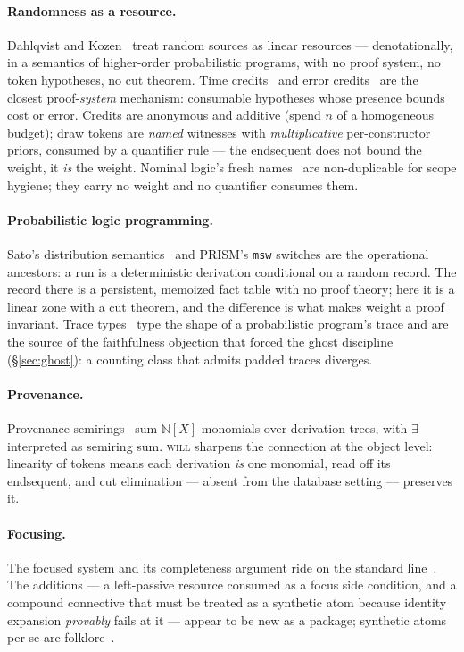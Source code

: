 \documentclass[11pt]{article}
\newcommand{\NN}{\mathbb{N}}                     %
\newcommand{\will}{\textsc{will}}                %
\theoremstyle{definition}
\theoremstyle{remark}
\begin{document}
\paragraph{Randomness as a resource.}  Dahlqvist and
Kozen~\cite{DahlqvistKozen2020} treat random sources as linear
resources --- denotationally, in a semantics of higher-order
probabilistic programs, with no proof system, no token hypotheses, no
cut theorem.  Time credits~\cite{CharguerraudPottier2017} and error
credits~\cite{Eris2024} are the closest proof-\emph{system} mechanism:
consumable hypotheses whose presence bounds cost or error.  Credits
are anonymous and additive (spend $n$ of a homogeneous budget);
draw tokens are \emph{named} witnesses with \emph{multiplicative}
per-constructor priors, consumed by a quantifier rule --- the
endsequent does not bound the weight, it \emph{is} the weight.
Nominal logic's fresh names~\cite{Pitts2003,MillerTiu2005} are
non-duplicable for scope hygiene; they carry no weight and no
quantifier consumes them.

\paragraph{Probabilistic logic programming.}  Sato's distribution
semantics~\cite{Sato1995} and PRISM's \texttt{msw} switches are the
operational ancestors: a run is a deterministic derivation conditional
on a random record.  The record there is a persistent, memoized fact
table with no proof theory; here it is a linear zone with a cut
theorem, and the difference is what makes weight a proof invariant.
Trace types~\cite{LewPOPL2020} type the shape of a probabilistic
program's trace and are the source of the faithfulness objection that
forced the ghost discipline (\S\ref{sec:ghost}): a counting class that
admits padded traces diverges.

\paragraph{Provenance.}  Provenance
semirings~\cite{GreenKT2007,GradelTannen2024} sum $\NN[X]$-monomials
over derivation trees, with $\exists$ interpreted as semiring sum.
\will{} sharpens the connection at the object level: linearity of
tokens means each derivation \emph{is} one monomial, read off its
endsequent, and cut elimination --- absent from the database setting
--- preserves it.

\paragraph{Focusing.}  The focused system and its completeness
argument ride on the standard
line~\cite{Andreoli1992,Laurent2004,MillerSaurin2007,ChaudhuriPfenningPrice2008,Simmons2014}.
The additions --- a left-passive resource consumed as a focus side
condition, and a compound connective that must be treated as a
synthetic atom because identity expansion \emph{provably} fails at it
--- appear to be new as a package; synthetic atoms per se are
folklore~\cite{Zeilberger2008}.
\end{document}
